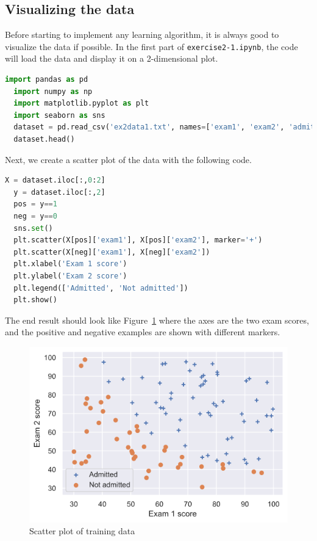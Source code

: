 \documentclass[12pt]{article}
\begin{document}
\subsection{Visualizing the data}
Before starting to implement any learning algorithm, it is always good to visualize the data if possible. In the first part of \texttt{exercise2-1.ipynb}, the code will load the
data and display it on a 2-dimensional plot.

\begin{lstlisting}[language=Python]
  import pandas as pd 
  import numpy as np
  import matplotlib.pyplot as plt
  import seaborn as sns
  dataset = pd.read_csv('ex2data1.txt', names=['exam1', 'exam2', 'admitted'])
  dataset.head()
\end{lstlisting}

Next, we create a scatter plot of the data with the following code.

\begin{lstlisting}[language=Python]
  X = dataset.iloc[:,0:2]
  y = dataset.iloc[:,2]
  pos = y==1
  neg = y==0
  sns.set()
  plt.scatter(X[pos]['exam1'], X[pos]['exam2'], marker='+')
  plt.scatter(X[neg]['exam1'], X[neg]['exam2'])
  plt.xlabel('Exam 1 score')
  plt.ylabel('Exam 2 score')
  plt.legend(['Admitted', 'Not admitted'])
  plt.show()
\end{lstlisting}

The end result should look like Figure~\ref{fig:scatter} where the axes are the two exam scores, and the positive and negative examples are shown with different markers.

\begin{figure}[h!]
  \centering
  \includegraphics[scale=0.6]{scatter.png}
  \caption{Scatter plot of training data}
  \label{fig:scatter}
\end{figure}
\end{document}
